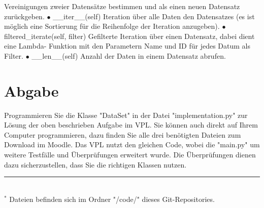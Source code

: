 \documentclass[]{article}
\begin{document}
\hspace*{1cm} Vereinigungen zweier Datensätze bestimmen und als einen neuen \newline\hspace*{1cm}Datensatz zurückgeben.
\newline
\newline
$\bullet$ \_\_iter\_\_(self)
\newline
\hspace*{1cm} Iteration über alle Daten den Datensatzes (es ist möglich eine Sortierung \hspace*{1cm} für die Reihenfolge der Iteration anzugeben).
\newline
\newline
$\bullet$ filtered\_iterate(self, filter)
\newline
\hspace*{1cm} Gefilterte Iteration über einen Datensatz, dabei dient eine Lambda-\hspace*{1cm} Funktion mit den Parametern Name und ID für jedes Datum als Filter.
\newline
\newline
$\bullet$ \_\_len\_\_(self)
\newline
\hspace*{1cm} Anzahl der Daten in einem Datensatz abrufen.
\newline
\newline

\section{Abgabe}
Programmieren Sie die Klasse "DataSet" in der Datei "implementation.py" zur Lösung der oben beschrieben Aufgabe im VPL.
Sie können auch direkt auf Ihrem Computer programmieren, dazu finden Sie alle drei benötigten Dateien zum Download im Moodle.\newline
\newline
Das VPL nutzt den gleichen Code, wobei die "main.py" um weitere Testfälle und Überprüfungen erweitert wurde.
Die Überprüfungen dienen dazu sicherzustellen, dass Sie die richtigen Klassen nutzen.\newline
%
\hrule\hfill\\[0.2cm]
$^*$ Dateien befinden sich im Ordner "/code/" dieses Git-Repositories.\newline
\end{document}
